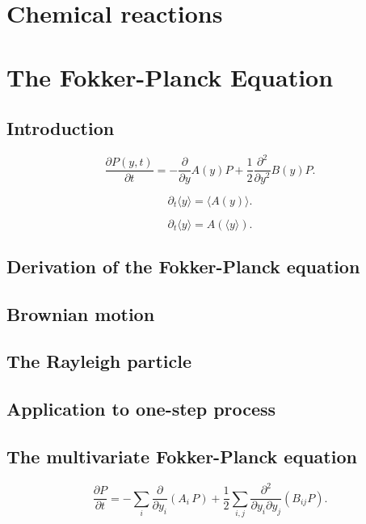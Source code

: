 \documentclass{book}
\numberwithin{equation}{section}
\theoremstyle{plain}
\theoremstyle{definition}
\theoremstyle{remark}
\begin{document}
\chapter{Chemical reactions}


\chapter{The Fokker-Planck Equation}

\section{Introduction}

\begin{equation}
  \frac{ \partial P(y, t) }  { \partial t }
=
-\frac{\partial } {\partial y} A(y) P
+\frac{1}{2} \frac{ \partial^2 } { \partial y^2 } B(y) P.
\tag{1.1}
\end{equation}


\begin{equation}
\partial_t \langle y \rangle
= \langle A(y) \rangle.
\tag{1.7}
\end{equation}

$$
\partial_t \langle y \rangle
= A(\langle y \rangle).
$$

\section{Derivation of the Fokker-Planck equation}

\section{Brownian motion}

\section{The Rayleigh particle}

\section{Application to one-step process}

\section{The multivariate Fokker-Planck equation}

\begin{equation}
\frac{ \partial P } { \partial t }
=
-\sum_i \frac{ \partial } { \partial y_i } (A_i \, P)
+ \frac 1 2
\sum_{i, j} \frac{ \partial^2 } { \partial y_i \partial y_j } (B_{ij} P ).
\tag{6.1}
\end{equation}
\end{document}
